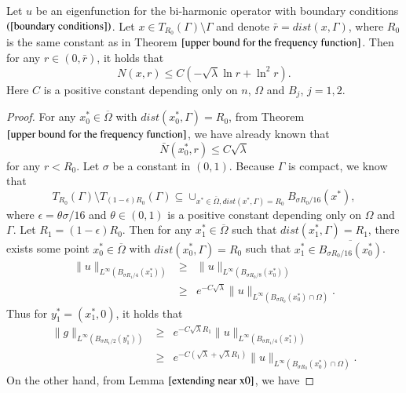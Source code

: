 \documentclass[a4paper, 12pt, onecolumn]{article} \textwidth 148mm
\begin{document}
\begin{lemma}\label{frequency function near the point x0}
Let $u$ be an eigenfunction for the bi-harmonic operator with boundary conditions $(\ref{boundary conditions})$.
Let $x\in T_{R_0}(\Gamma)\setminus\Gamma$ and denote $\bar{r}=dist(x,\Gamma)$, where $R_0$ is the same constant as in Theorem $\ref{upper bound for the frequency function}$. Then for any $r\in(0,\bar{r})$, it holds that
\begin{equation}
N(x,r)\leq C(-\sqrt{\lambda}\ln r+\ln^2r).
\end{equation}
Here $C$ is a positive constant depending only on $n$, $\Omega$ and $B_j$, $j=1,2$.
\end{lemma}

\begin{proof}
For any $x^*_0\in\overline{\Omega}$ with $dist(x^*_0,\Gamma)=R_0$, from Theorem $\ref{upper bound for the frequency function}$, we have already known that
\begin{equation*}
\bar{N}(x^*_0, r)\leq C\sqrt{\lambda}
\end{equation*}
for any $r<R_0$. Let $\sigma$ be a constant in $(0,1)$.
Because $\Gamma$ is compact, we know that
\begin{equation*}
T_{R_0}(\Gamma)\setminus T_{(1-\epsilon)R_0}(\Gamma)\subseteq\cup_{x^*\in\overline{\Omega},dist(x^*,\Gamma)=R_0}B_{\sigma R_0/16}(x^*),
\end{equation*}
where $\epsilon=\theta\sigma/16$ and $\theta\in(0,1)$ is a positive constant depending only on $\Omega$ and $\Gamma$. Let $R_1=(1-\epsilon)R_0$.
Then for any $x^*_1\in\overline{\Omega}$ such that $dist(x^*_1,\Gamma)=R_1$, there exists some point $x^*_0\in\overline{\Omega}$ with $dist(x^*_0,\Gamma)=R_0$ such that $x^*_1\in\overline{B_{\sigma R_0/16}(x^*_0)}$.
\begin{eqnarray*}
\|u\|_{L^{\infty}(B_{\sigma R_1/4}(x^*_1))}&\geq&
\|u\|_{L^{\infty}(B_{\sigma R_0/8}(x^*_0))}\\&\geq&
e^{-C\sqrt{\lambda}}\|u\|_{L^{\infty}(B_{\sigma R_0}(x^*_0)\cap\Omega)}.
\end{eqnarray*}
Thus for $y^*_1=(x^*_1,0)$, it holds that
\begin{eqnarray*}
\|g\|_{L^{\infty}(B_{\sigma R_1/2}(y^*_1))}&\geq&e^{-C\sqrt{\lambda}R_1}\|u\|_{L^{\infty}(B_{\sigma R_1/4}(x^*_1))}\\&\geq& e^{-C(\sqrt{\lambda}+\sqrt{\lambda}R_1)}\|u\|_{L^{\infty}(B_{\sigma R_0}(x^*_0)\cap\Omega)}.
\end{eqnarray*}
On the other hand, from Lemma $\ref{extending near x0}$, we have

\end{proof}
\end{document}
